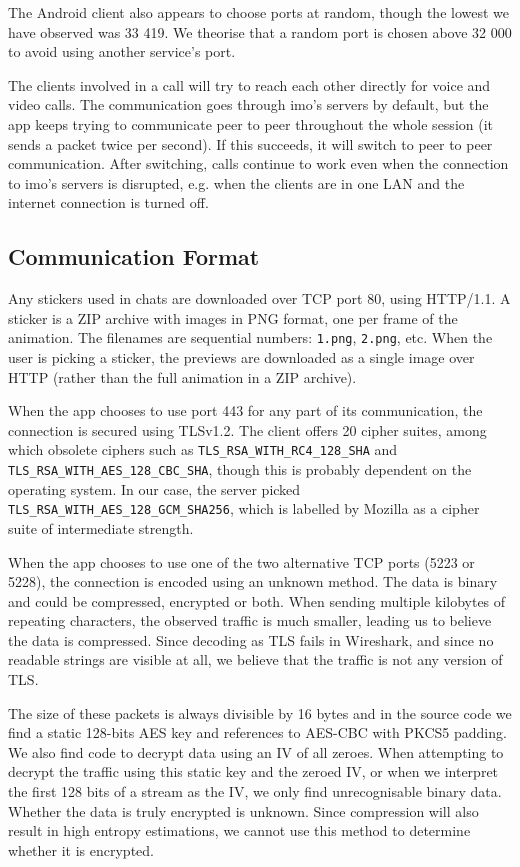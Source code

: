 \documentclass[conference]{IEEEtran}
\begin{document}
The Android client also appears to choose ports at random, though the lowest we
have observed was 33 419. We theorise that a random port is chosen above 32 000
to avoid using another service's port.

The clients involved in a call will try to reach each other directly for voice
and video calls. The communication goes through imo's servers by default, but
the app keeps trying to communicate peer to peer throughout the whole session
(it sends a packet twice per second). If this succeeds, it will switch to peer
to peer communication. After switching, calls continue to work even when the
connection to imo's servers is disrupted, e.g. when the clients are in one LAN
and the internet connection is turned off.


\subsection{Communication Format}

Any stickers used in chats are downloaded over TCP port 80, using HTTP/1.1. A
sticker is a ZIP archive with images in PNG format, one per frame of the
animation. The filenames are sequential numbers: \texttt{1.png}, \texttt{2.png},
etc. When the user is picking a sticker, the previews are downloaded as a single
image over HTTP (rather than the full animation in a ZIP archive).

When the app chooses to use port 443 for any part of its communication, the
connection is secured using TLSv1.2. The client offers 20 cipher suites, among
which obsolete ciphers such as \texttt{TLS\_RSA\_WITH\_RC4\_128\_SHA} and
\texttt{TLS\_RSA\_WITH\_AES\_128\_CBC\_SHA}, though this is probably dependent
on the operating system. In our case, the server picked
\texttt{TLS\_RSA\_WITH\_AES\_128\_GCM\_SHA256}, which is labelled by Mozilla as a
cipher suite of intermediate strength\cite{moz-tls}.

When the app chooses to use one of the two alternative TCP ports (5223 or
5228), the connection is encoded using an unknown method. The data is binary
and could be compressed, encrypted or both. When sending multiple kilobytes of
repeating characters, the observed traffic is much smaller, leading us to
believe the data is compressed. Since decoding as TLS fails in Wireshark, and
since no readable strings are visible at all, we believe that the traffic is
not any version of TLS.

The size of these packets is always divisible by 16 bytes and in the source
code we find a static 128-bits AES key and references to AES-CBC with PKCS5
padding. We also find code to decrypt data using an IV of all zeroes. When
attempting to decrypt the traffic using this static key and the zeroed IV, or
when we interpret the first 128 bits of a stream as the IV, we only find
unrecognisable binary data. Whether the data is truly encrypted is unknown.
Since compression will also result in high entropy estimations, we cannot use
this method to determine whether it is encrypted.
\end{document}
